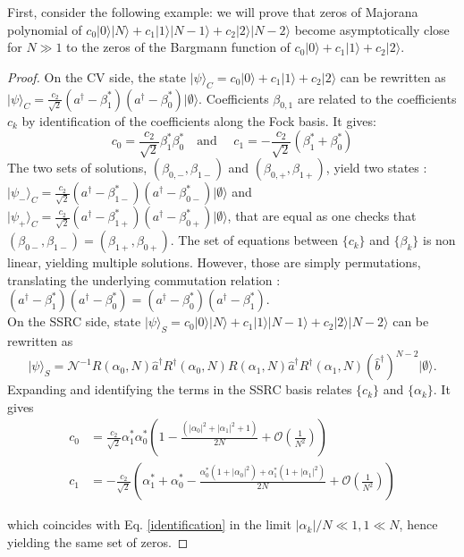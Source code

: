 \documentclass[aps,prl,showpacs,twocolumn]{revtex4-2}
\providecommand{\ket}[1]{\lvert #1 \rangle}
\providecommand{\be}{\begin{equation}}
\providecommand{\ee}{\end{equation}}
\providecommand{\ket}[1]{\lvert #1 \rangle}
\providecommand{\be}{\begin{equation}}
\providecommand{\ee}{\end{equation}}
\providecommand{\ket}[1]{\lvert #1 \rangle}
\providecommand{\be}{\begin{equation}}
\providecommand{\ee}{\end{equation}}
\providecommand{\ket}[1]{\lvert #1 \rangle}
\providecommand{\be}{\begin{equation}}
\providecommand{\ee}{\end{equation}}
\begin{document}
First, consider the following example:  we will prove that zeros of Majorana polynomial of $c_0\ket{0}\ket{N} + c_1\ket{1}\ket{N-1}+ c_2\ket{2}\ket{N-2}$ become asymptotically close for $N\gg1$ to the zeros of the Bargmann function of $c_0\ket{0} + c_1\ket{1}+ c_2\ket{2}$.
\begin{proof}
On the CV side, the state $\ket{\psi}_C = c_0\ket{0}+c_1\ket{1} +c_2\ket{2}$ can be rewritten as $\ket{\psi}_C =  \frac{c_2}{\sqrt{2}}(a^\dagger-\beta_1^*)(a^\dagger-\beta_0^*)\ket{\emptyset}$. Coefficients $\beta_{0,1}$ are related to the coefficients $c_k$ by identification of the coefficients along the Fock basis. It gives:
	\begin{equation}\label{identification}
		c_0  =\frac{c_2}{\sqrt{2}}\beta_1^*\beta_0^* \quad \text{and } \quad c_1=-\frac{c_2}{\sqrt{2}}(\beta_1^*+\beta_0^*)
	\end{equation}
	The two sets of solutions, $(\beta_{0,-},\beta_{1-}) $ and $(\beta_{0,+},\beta_{1+}) $, yield two states : $\ket{\psi_-}_C = \frac{c_2}{\sqrt{2}}(a^\dagger-\beta_{1-}^*)(a^\dagger-\beta_{0-}^*)\ket{\emptyset}$ and $\ket{\psi_+}_C = \frac{c_2}{\sqrt{2}}(a^\dagger-\beta_{1+}^*)(a^\dagger-\beta_{0+}^*)\ket{\emptyset}$, that are equal as one checks that $(\beta_{0-},\beta_{1-})  = (\beta_{1+},\beta_{0+}) $. The set of equations between $\{c_k\}$ and $\{\beta_k\}$ is non linear, yielding multiple solutions. However, those are simply permutations, translating the underlying commutation relation : $(a^\dagger-\beta_1^*)(a^\dagger-\beta_0^*) = (a^\dagger-\beta_0^*)(a^\dagger-\beta_1^*)$.\\

 On the SSRC side, state $\ket{\psi}_S = c_0\ket{0}\ket{N} + c_1\ket{1}\ket{N-1}+ c_2\ket{2}\ket{N-2}$ can be rewritten as
 \be
 \ket{\psi}_S= \mathcal{N}^{-1} R(\alpha_0, N )\hat{a}^\dagger R^\dagger(\alpha_0, N ) R(\alpha_1, N )\hat{a}^\dagger R^\dagger(\alpha_1, N ) (\hat{b}^\dagger)^{N-2}\ket{\emptyset}.
 \ee
Expanding and identifying the terms in the SSRC basis relates $\{c_k\}$ and $\{\alpha_k\}$. It gives
	\begin{align}
		c_0  &=\frac{c_2}{\sqrt{2}}\alpha_1^*\alpha_0^* \left(1-\frac{(|\alpha_0|^2+ |\alpha_1|^2+1)}{2N}+\mathcal{O}(\frac{1}{N^2}) \right)\\
        c_1&=-\frac{c_2}{\sqrt{2}}\left(\alpha_1^*+\alpha_0^* -\frac{\alpha_0^*(1+|\alpha_0|^2)+\alpha_1^*(1+|\alpha_1|^2)}{2N}+\mathcal{O}(\frac{1}{N^2})\right)
	\end{align}

which coincides with Eq. \ref{identification} in the limit $|\alpha_k|/N\ll1, 1\ll N $, hence yielding the same set of zeros.
\end{proof}
\end{document}
